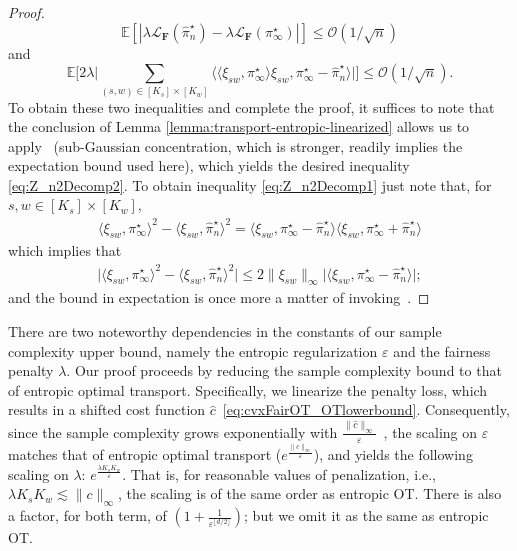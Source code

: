 \documentclass{article}
\theoremstyle{definition}
\begin{document}
\begin{proof}
\begin{equation}
    \mathbb{E}[|\lambda\mathcal{L}_\mathbf{F}(\hat \pi_n^\star)-\lambda \mathcal{L}_\mathbf{F}(\pi_\infty^\star)|]\leq \mathcal{O}(1/\sqrt{n})
\end{equation}
and
\begin{equation}\label{eq:Z_n2Decomp1}
    \mathbb{E}\Big[2\lambda\big|\sum_{(s,w)\in [K_s] \times [K_w]}\big\langle \langle \xi_{sw},\pi^\star_\infty\rangle \xi_{sw}, \pi_\infty^\star-\hat{\pi}_n^\star
\big\rangle\big|\Big]\leq \mathcal{O}(1/\sqrt{n}).
\end{equation}
To obtain these two inequalities and complete the proof, it suffices to note that the conclusion of Lemma \ref{lemma:transport-entropic-linearized} allows us to apply~ (sub-Gaussian concentration, which is stronger, readily implies the expectation bound used here), which yields the desired inequality \eqref{eq:Z_n2Decomp2}. To obtain inequality \eqref{eq:Z_n2Decomp1} just note that, for $s,w \in [K_s] \times [K_w]$, 
\begin{align*}
\langle \xi_{sw},\pi^\star_\infty\rangle^2-\langle \xi_{sw},\hat\pi_n^\star\rangle^2=\langle \xi_{sw},\pi^\star_\infty-\hat\pi_n^\star\rangle\langle \xi_{sw},\pi^\star_\infty+\hat\pi_n^\star\rangle
\end{align*}
which implies that
\begin{align*}
\big|\langle \xi_{sw},\pi^\star_\infty\rangle^2-\langle \xi_{sw},\hat\pi_n^\star\rangle^2\big|\leq 2\|\xi_{sw}\|_\infty\big|\langle \xi_{sw},\pi^\star_\infty-\hat\pi_n^\star\rangle\big|;
\end{align*}
and the bound in expectation is once more a matter of invoking~.
\end{proof}
There are two noteworthy dependencies in the constants of our sample complexity upper bound, namely the entropic regularization $\varepsilon$ and the fairness penalty $\lambda$. 
Our proof proceeds by reducing the sample complexity bound to that of entropic optimal transport. 
Specifically, we linearize the penalty loss, which results in a shifted cost function $\hat c$~\eqref{eq:cvxFairOT_OTlowerbound}. 
Consequently, since the sample complexity grows exponentially with $\frac{\|\hat c\|_\infty}{\varepsilon}$~\citep[Theorem 3]{genevay2019entropy}, the scaling on $\varepsilon$ matches that of entropic optimal transport ($e^{\frac{\|c\|_\infty}{\varepsilon}}$), and yields the following scaling on $\lambda$: $e^{\frac{\lambda K_s K_w}{\varepsilon}}$. That is, for reasonable values of penalization, i.e., $\lambda K_s K_w \lesssim \|c\|_\infty$, the scaling is of the same order as entropic OT.  There is also a factor, for both term, of $(1+\frac{1}{\varepsilon^{\lfloor d/2 \rfloor}})$; but we omit it as the same as entropic OT.
\end{document}
